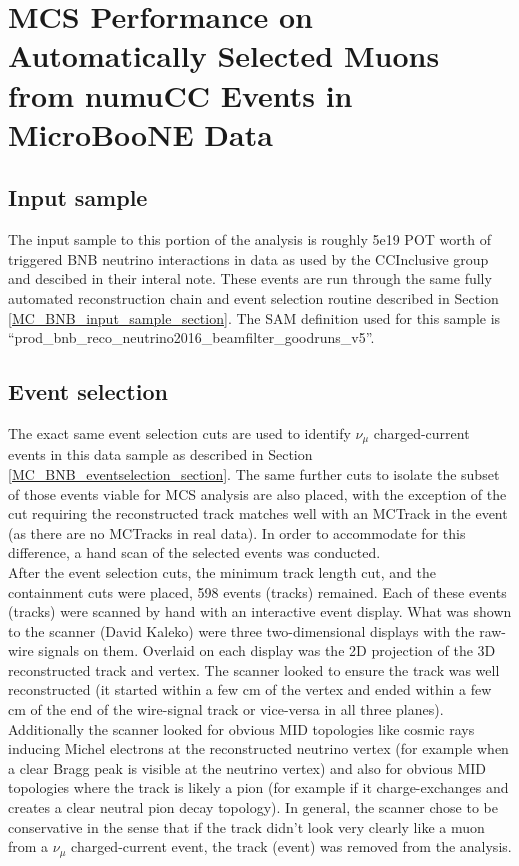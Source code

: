 \section{MCS Performance on Automatically Selected Muons from numuCC Events in MicroBooNE Data}\label{data_performance_section}

\subsection{Input sample}
The input sample to this portion of the analysis is roughly 5e19 POT worth of triggered BNB neutrino interactions in {\ub} data as used by the CCInclusive group and descibed in their interal note\cite{CCIncInternalNote}. These events are run through the same fully automated reconstruction chain and event selection routine described in Section \ref{MC_BNB_input_sample_section}. The SAM definition used for this sample is ``prod\_bnb\_reco\_neutrino2016\_beamfilter\_goodruns\_v5''.

\subsection{Event selection}
The exact same event selection cuts are used to identify $\nu_\mu$ charged-current events in this data sample as described in Section \ref{MC_BNB_eventselection_section}. The same further cuts to isolate the subset of those events viable for MCS analysis are also placed, with the exception of the cut requiring the reconstructed track matches well with an {\sc MCTrack} in the event (as there are no {\sc MCTracks} in real data). In order to accommodate for this difference, a hand scan of the selected events was conducted.\\

After the event selection cuts, the minimum track length cut, and the containment cuts were placed, 598 events (tracks) remained. Each of these events (tracks) were scanned by hand with an interactive event display. What was shown to the scanner (David Kaleko) were three two-dimensional displays with the raw-wire signals on them. Overlaid on each display was the 2D projection of the 3D reconstructed track and vertex. The scanner looked to ensure the track was well reconstructed (it started within a few cm of the vertex and ended within a few cm of the end of the wire-signal track or vice-versa in all three planes). Additionally the scanner looked for obvious MID topologies like cosmic rays inducing Michel electrons at the reconstructed neutrino vertex (for example when a clear Bragg peak is visible at the neutrino vertex) and also for obvious MID topologies where the track is likely a pion (for example if it charge-exchanges and creates a clear neutral pion decay topology). In general, the scanner chose to be conservative in the sense that if the track didn't look very clearly like a muon from a $\nu_\mu$ charged-current event, the track (event) was removed from the analysis.\\

